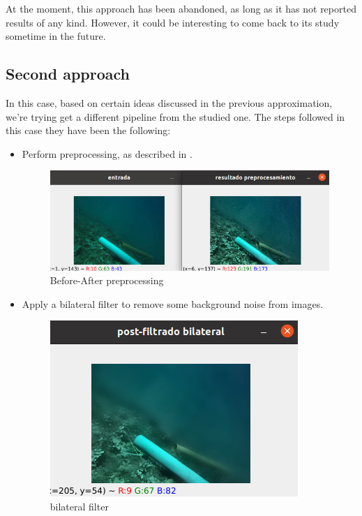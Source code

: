 \documentclass[12pt, a4paper]{article}
\begin{document}
At the moment, this approach has been abandoned, as long as it has not reported results of any kind. However, it could be 
interesting to come back to its study sometime in the future. 


\subsection{Second approach}



In this case, based on certain ideas discussed in the previous approximation,
we're trying get a different pipeline from the studied one.  The steps followed
in this case they have been the following:

\begin{itemize}
    
    \item Perform preprocessing, as described in .
    
    \begin{figure}[H]
        \centering
        \includegraphics[scale=0.3]{images_doc/preprocess.png}
        \caption{Before-After preprocessing}
        \label{fig:pprepre}
    \end{figure}

    \item Apply a bilateral filter to remove some background noise from images.
    
    \begin{figure}[H]
        \centering
        \includegraphics[scale=0.3]{images_doc/filtradobilat.png}
        \caption{bilateral filter}
        \label{fig:bilat}
    \end{figure}


\end{itemize}
\end{document}
